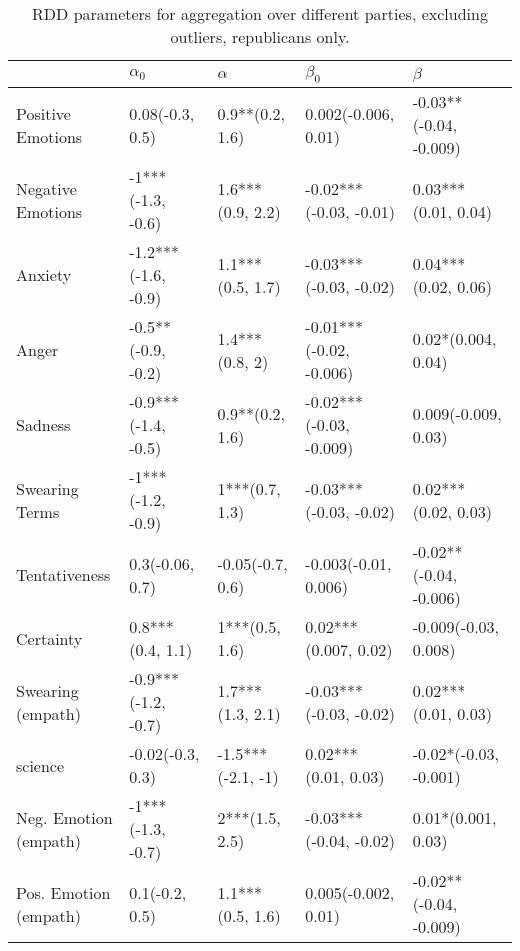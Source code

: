 \begin{table}[h]\centering
\caption{RDD parameters for aggregation over different parties, excluding outliers, republicans only.}
	\label{fig: Party_4}
\begin{adjustbox}{width=\linewidth, center}
	\begin{tabular}{lllll}
	\toprule
	{} &           $\alpha_0$ &           $\alpha$ &                $\beta_0$ &                 $\beta$ \\
	\midrule
	Positive Emotions     &      0.08(-0.3, 0.5) &    0.9**(0.2, 1.6) &      0.002(-0.006, 0.01) &  -0.03**(-0.04, -0.009) \\
	Negative Emotions     &    -1***(-1.3, -0.6) &   1.6***(0.9, 2.2) &   -0.02***(-0.03, -0.01) &     0.03***(0.01, 0.04) \\
	Anxiety               &  -1.2***(-1.6, -0.9) &   1.1***(0.5, 1.7) &   -0.03***(-0.03, -0.02) &     0.04***(0.02, 0.06) \\
	Anger                 &   -0.5**(-0.9, -0.2) &     1.4***(0.8, 2) &  -0.01***(-0.02, -0.006) &      0.02*(0.004, 0.04) \\
	Sadness               &  -0.9***(-1.4, -0.5) &    0.9**(0.2, 1.6) &  -0.02***(-0.03, -0.009) &     0.009(-0.009, 0.03) \\
	Swearing Terms        &    -1***(-1.2, -0.9) &     1***(0.7, 1.3) &   -0.03***(-0.03, -0.02) &     0.02***(0.02, 0.03) \\
	Tentativeness         &      0.3(-0.06, 0.7) &   -0.05(-0.7, 0.6) &     -0.003(-0.01, 0.006) &  -0.02**(-0.04, -0.006) \\
	Certainty             &     0.8***(0.4, 1.1) &     1***(0.5, 1.6) &     0.02***(0.007, 0.02) &    -0.009(-0.03, 0.008) \\
	Swearing (empath)     &  -0.9***(-1.2, -0.7) &   1.7***(1.3, 2.1) &   -0.03***(-0.03, -0.02) &     0.02***(0.01, 0.03) \\
	science               &     -0.02(-0.3, 0.3) &  -1.5***(-2.1, -1) &      0.02***(0.01, 0.03) &   -0.02*(-0.03, -0.001) \\
	Neg. Emotion (empath) &    -1***(-1.3, -0.7) &     2***(1.5, 2.5) &   -0.03***(-0.04, -0.02) &      0.01*(0.001, 0.03) \\
	Pos. Emotion (empath) &       0.1(-0.2, 0.5) &   1.1***(0.5, 1.6) &      0.005(-0.002, 0.01) &  -0.02**(-0.04, -0.009) \\
	\bottomrule
	\end{tabular}
	
\end{adjustbox}
	\end{table}

